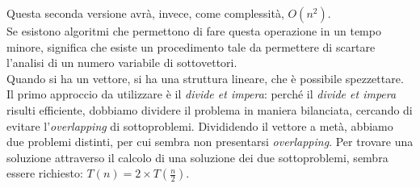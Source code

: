 Questa seconda versione avrà, invece, come complessità, $O(n^2)$. \\
Se esistono algoritmi che permettono di fare questa operazione in un tempo minore, significa che esiste un procedimento tale da permettere di scartare l'analisi di un numero variabile di sottovettori. \\
Quando si ha un vettore, si ha una struttura lineare, che è possibile spezzettare. Il primo approccio da utilizzare è il \textit{divide et impera}: perché il \textit{divide et impera} risulti efficiente, dobbiamo dividere il problema in maniera bilanciata, cercando di evitare l'\textit{overlapping} di sottoproblemi. Divididendo il vettore a metà, abbiamo due problemi distinti, per cui sembra non presentarsi \textit{overlapping}. Per trovare una soluzione attraverso il calcolo di una soluzione dei due sottoproblemi, sembra essere richiesto: $T(n) = 2\times T(\frac{n}{2})$. \\
\newpage

